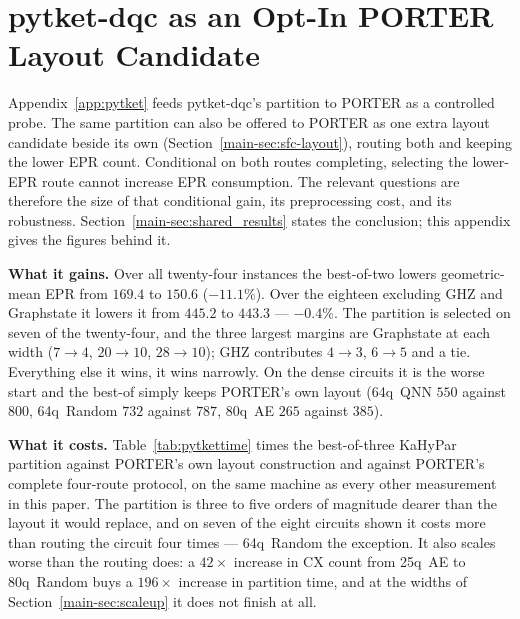 \documentclass[journal]{IEEEtran}
\newcommand{\PORTER}{\textsc{PORTER}}
\newcommand{\mainInitialLayout}{Section~\ref{main-sec:sfc-layout}}
\newcommand{\mainSharedResults}{Section~\ref{main-sec:shared_results}}
\newcommand{\mainScaleup}{Section~\ref{main-sec:scaleup}}
\begin{document}
\section{pytket-dqc as an Opt-In \PORTER{} Layout Candidate}
\label{app:optin}

Appendix~\ref{app:pytket} feeds pytket-dqc's partition to \PORTER{} as a
controlled probe. The same partition can also be offered to \PORTER{} as
one extra layout candidate beside its own (\mainInitialLayout{}), routing
both and keeping the lower EPR count. Conditional on both routes completing, selecting the lower-EPR route cannot
increase EPR consumption. The relevant questions are therefore the size of
that conditional gain, its preprocessing cost, and its robustness.
\mainSharedResults{} states the conclusion; this appendix gives the
figures behind it.

\textbf{What it gains.} Over all twenty-four instances the best-of-two
lowers geometric-mean EPR from $169.4$ to $150.6$ ($-11.1\%$). Over the
eighteen excluding GHZ and Graphstate it lowers it from $445.2$ to
$443.3$ --- $\mathbf{-0.4\%}$. The partition is selected on seven of the
twenty-four, and the three largest margins are Graphstate at each width
($7\!\to\!4$, $20\!\to\!10$, $28\!\to\!10$); GHZ contributes
$4\!\to\!3$, $6\!\to\!5$ and a tie. Everything else it wins, it wins
narrowly. On the dense circuits it is the worse start and the best-of
simply keeps \PORTER{}'s own layout (64q~QNN $550$ against $800$,
64q~Random $732$ against $787$, 80q~AE $265$ against $385$).

\textbf{What it costs.} Table~\ref{tab:pytkettime} times the
best-of-three KaHyPar partition against \PORTER{}'s own layout
construction and against \PORTER{}'s complete four-route protocol, on
the same machine as every other measurement in this paper. The partition
is three to five orders of magnitude dearer than the layout it would
replace, and on seven of the eight circuits shown it costs more than
routing the circuit four times --- 64q~Random the exception. It also
scales worse than the routing does: a $42\times$ increase in CX count from
25q~AE to 80q~Random buys a $196\times$ increase in partition time, and at
the widths of
\mainScaleup{} it does not finish at all.
\end{document}

